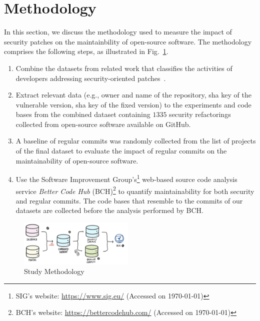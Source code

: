 \documentclass[smallextended]{svjour3}       %
\begin{document}
\section{Methodology}\label{sec:methodology}
%

In this section, we discuss the methodology used to measure
the impact of security patches on the maintainbility of open-source
software. The methodology comprises the following steps, as illustrated in
Fig.~\ref{fig:met}.
%
\begin{enumerate}
	\item Combine the datasets from related work that classifies
the activities of developers addressing security-oriented patches~\cite{Reis:2017:IJSSE,10.1109/MSR.2019.00064}.
%
	\item
	Extract relevant data (e.g., owner and name of
	the repository, sha key of the vulnerable version, sha key of the fixed version) to the experiments and 
	code bases from the combined dataset containing $1335$ security
	refactorings collected from open-source software available on
	GitHub.
%
	\item A baseline of regular commits was randomly collected from the list of
	projects of the final dataset to evaluate the impact of regular commits on the
	maintainability of open-source software.
%
  \item Use the Software Improvement Group's\footnote{SIG's website: \url{https://www.sig.eu/} 
  (Accessed on \today{})} web-based source code analysis
  service \emph{Better Code Hub} (BCH)\footnote{BCH's website:
  \url{https://bettercodehub.com/} (Accessed on \today{})} to quantify maintainability
  for both security and regular commits. The code bases that resemble to the commits
  of our datasets are collected before the analysis performed by BCH.
\end{enumerate}
%
\begin{figure}[h]
	 	\centering 	
    \begin{adjustwidth}{0.5cm}{-1cm}  
	\includegraphics[width=0.49\textwidth]{figures/methodology.pdf}
	
 	\caption{Study Methodology}
	\label{fig:met}
	 \end{adjustwidth}
\end{figure}
%
\end{document}
